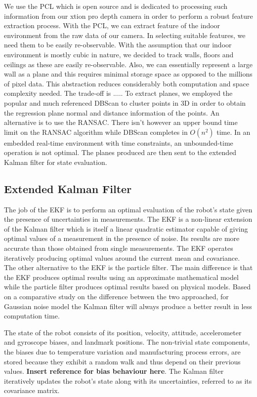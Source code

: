 \documentclass[]{article}
\begin{document}
{We use the PCL which is open source and is dedicated to processing such information from our xtion pro depth camera in order to perform a robust feature extraction process. With the PCL, we can extract feature of the indoor environment from the raw data of our camera. In selecting suitable features, we need them to be easily re-observable. With the assumption that our indoor environment is mostly cubic in nature, we decided to track walls, floors and ceilings as these are easily re-observable. Also, we can essentially represent a large wall as a plane and this requires minimal storage space as opposed to the millions of pixel data. This abstraction reduces considerably both computation and space complexity needed. The trade-off is .....
To extract planes, we employed the popular and much referenced DBScan to cluster points in 3D in order to obtain the regression plane normal and distance information of the points. An alternative is to use the RANSAC. There isn't however an upper bound time limit on the RANSAC algorithm while DBScan completes in $O(n^{2})$ time. In an embedded real-time environment with time constraints, an unbounded-time operation is not optimal. The planes produced are then sent to the extended Kalman filter for state evaluation.

\subsection{Extended Kalman Filter}
The job of the EKF is to perform an optimal evaluation of the robot's state given the presence of uncertainties in measurements. The EKF is a non-linear extension of the Kalman filter which is itself a linear quadratic estimator capable of giving optimal values of a measurement in the presence of noise. Its results are more accurate than those obtained from single measurements. The EKF operates iteratively producing optimal values around the current mean and covariance. The other alternative to the EKF is the particle filter. The main difference is that the EKF produces optimal results using an approximate mathematical model while the particle filter produces optimal results based on physical models.
\cite{CompareFilters}Based on a comparative study on the difference between the two approached, for Gaussian noise model the Kalman filter will always produce a better result in less computation time.

The state of the robot consists of its position, velocity, attitude, accelerometer and gyroscope biases, and landmark positions. The non-trivial state components, the biases due to temperature variation and manufacturing process errors, are stored because they exhibit a random walk and thus depend on their previous values. \textbf{Insert reference for bias behaviour here}. The Kalman filter iteratively updates the robot's state along with its uncertainties, referred to as its covariance matrix.

}
\end{document}
